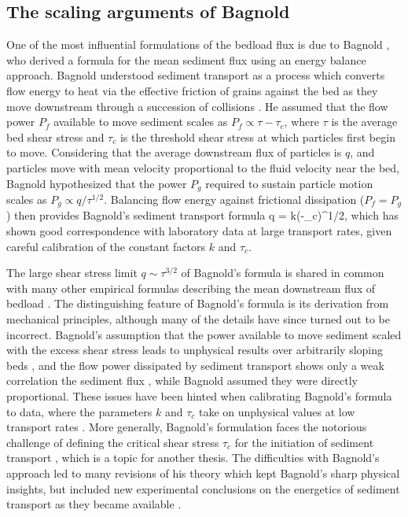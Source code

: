 \subsection{The scaling arguments of Bagnold}

One of the most influential formulations of the bedload flux is due to Bagnold \citep{Bagnold1956,Bagnold1966}, who derived a formula for the mean sediment flux using an energy balance approach.
Bagnold understood sediment transport as a process which converts flow energy to heat via the effective friction \citep{Bagnold1954} of grains against the bed as they move downstream through a succession of collisions \citep{Bagnold1973}.
He assumed that the flow power $P_f$ available to move sediment scales as $P_f \propto \tau - \tau_c$, where $\tau$ is the average bed shear stress and $\tau_c$ is the threshold shear stress at which particles first begin to move. 
Considering that the average downstream flux of particles is $q$, and particles move with mean velocity proportional to the fluid velocity near the bed, Bagnold hypothesized that the power $P_g$ required to sustain particle motion scales as $P_g \propto q/\tau^{1/2}.$
 Balancing flow energy against frictional dissipation ($P_f = P_g$) then provides Bagnold's sediment transport formula
\be q = k(\tau-\tau_c)\tau^{1/2}, \label{eq:bagnold}\ee
which has shown good correspondence with laboratory data at large transport rates, given careful calibration of the constant factors $k$ and $\tau_c$.

The large shear stress limit $q \sim \tau^{3/2}$ of Bagnold's formula is shared in common with many other empirical formulas describing the mean downstream flux of bedload \citep[e.g.][]{MeyerPeter1948, Yalin1972, Wilcock2003, Parker1990}. The distinguishing feature of Bagnold's formula is its derivation from mechanical principles, although many of the details have since turned out to be incorrect. Bagnold's assumption that the power available to move sediment scaled with the excess shear stress leads to unphysical results over arbitrarily sloping beds \citep{Seminara2002}, and the flow power dissipated by sediment transport shows only a weak correlation the sediment flux \citep{Ancey2008}, while Bagnold assumed they were directly proportional. These issues have been hinted when calibrating Bagnold's formula to data, where the parameters $k$ and $\tau_c$ take on unphysical values at low transport rates \citep{Nino1996}.
More generally, Bagnold's formulation faces the notorious challenge of defining the critical shear stress $\tau_c$ for the initiation of sediment transport \citep{Paintal1971,Kirchener1990,Houssais2015,Clark2017,Allen2018}, which is a topic for another thesis. 
The difficulties with Bagnold's approach led to many revisions of his theory which kept Bagnold's sharp physical insights, but included new experimental conclusions on the energetics of sediment transport as they became available \citep{Engelund1976,Luque1976,Nino1998,Martin2000}.

